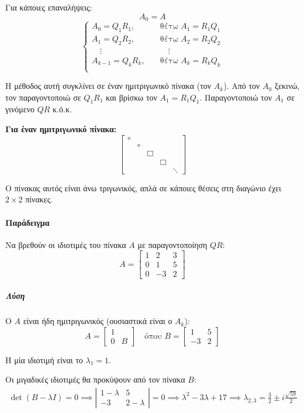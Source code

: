 \documentclass[11pt,a4paper,notitlepage,fleqn,final]{article}
\begin{document}
Για κάποιες επαναλήψεις:
\[
A_0 = A
\]
\[
\begin{cases}
A_0 = Q_1R_1, &\quad \text{θέτω } A_1 = R_1Q_1 \\
A_1 = Q_2R_2, &\quad \text{θέτω } A_2 = R_2Q_2 \\
\quad \vdots &\quad \quad \vdots \\
A_{k-1} = Q_kR_k, &\quad \text{θέτω } A_k = R_kQ_k \\
\end{cases}
\]

Η μέθοδος αυτή συγκλίνει σε έναν ημιτριγωνικό πίνακα (τον
\( A_k \)). Από τον \( A_0 \) ξεκινώ, τον παραγοντοποιώ σε
\( Q_1R_1 \) και βρίσκω τον \( A_1 = R_1Q_1 \). Παραγοντοποιώ τον
\( A_1 \) σε γινόμενο \( QR \) κ.ό.κ.

\textbf{Για έναν ημιτριγωνικό πίνακα:}
\[ \left[
\begin{matrix}
\circ & & & & \\
& \circ & & & \\
& & \Box & & \\
& & & \Box & \\
& & & & \ddots
\end{matrix} \right]
\]

Ο πίνακας αυτός είναι άνω τριγωνικός, απλά σε κάποιες θέσεις στη
διαγώνιο έχει \( 2\times 2 \) πίνακες.

\paragraph{Παράδειγμα}
Να βρεθούν οι ιδιοτιμές του πίνακα \( A \) με παραγοντοποίηση
\( QR \):
\[
A = \left[\begin{matrix}
1&2&3 \\ 0 & 1 & 5 \\ 0 & -3 & 2
\end{matrix}\right]
\]
\subparagraph{Λύση}
Ο \( A \) είναι ήδη ημιτριγωνικός (ουσιαστικά είναι ο \( A_k \)):
\[
A = \left[\begin{matrix}
1 & \\ 0 & \boxed{B}
\end{matrix}
\right] \quad \text{όπου } B = \left[
\begin{matrix}
1 & 5 \\ -3 & 2
\end{matrix}\right]
\]

Η μία ιδιοτιμή είναι το \( \lambda_1 = 1 \).

Οι μιγαδικές ιδιοτιμές θα προκύψουν από τον πίνακα \( B \):
\begin{align*}
	\det(B-\lambda I) = 0 \implies
	\left|\begin{matrix}
	1-\lambda & 5 \\ -3 & 2-\lambda
	\end{matrix}
	\right| = 0 \implies \lambda^2 -3\lambda + 17
	\implies \lambda_{2,3} =\frac{3}{2} \pm i\frac{\sqrt{59}}{2}
\end{align*}
\end{document}

